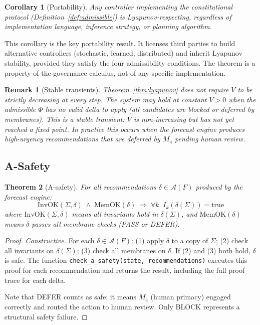 \documentclass[11pt]{article}
\newtheorem{theorem}{Theorem}[section]
\newtheorem{corollary}[theorem]{Corollary}
\newtheorem{remark}{Remark}[section]
\begin{document}
\begin{corollary}[Portability]
Any controller implementing the constitutional protocol
(Definition~\ref{def:admissible}) is Lyapunov-respecting,
regardless of implementation language, inference strategy,
or planning algorithm.
\end{corollary}

This corollary is the key portability result. It licenses third
parties to build alternative controllers (stochastic, learned,
distributed) and inherit Lyapunov stability, provided they satisfy
the four admissibility conditions. The theorem is a property of
the governance calculus, not of any specific implementation.

\begin{remark}[Stable transients]
Theorem~\ref{thm:lyapunov} does not require $V$ to be strictly
decreasing at every step. The system may hold at constant $V > 0$
when the admissible $\Phi$ has no valid delta to apply (all
candidates are blocked or deferred by membranes). This is a
\emph{stable transient}: $V$ is non-increasing but has not yet
reached a fixed point. In practice this occurs when the forecast
engine produces high-urgency recommendations that are deferred
by $M_4$ pending human review.
\end{remark}

\subsection{A-Safety}

\begin{theorem}[A-safety]
\label{thm:a-safety}
For all recommendations $\delta \in \mathcal{A}(F)$ produced by
the forecast engine:
\[
  \mathrm{InvOK}(\Sigma, \delta) \;\wedge\; \mathrm{MemOK}(\delta)
  \;\Longrightarrow\;
  \forall k.\; I_k(\delta(\Sigma)) = \mathrm{true}
\]
where $\mathrm{InvOK}(\Sigma, \delta)$ means all invariants hold
in $\delta(\Sigma)$, and $\mathrm{MemOK}(\delta)$ means $\delta$
passes all membrane checks (PASS or DEFER).
\end{theorem}

\begin{proof}
\emph{Constructive.} For each $\delta \in \mathcal{A}(F)$:
(1) apply $\delta$ to a copy of $\Sigma$;
(2) check all invariants on $\delta(\Sigma)$;
(3) check all membranes on $\delta$.
If (2) and (3) both hold, $\delta$ is safe. The function
\texttt{check\_a\_safety(state, recommendations)} executes this
proof for each recommendation and returns the result, including
the full proof trace for each delta.

Note that DEFER counts as safe: it means $M_4$ (human primacy)
engaged correctly and routed the action to human review. Only
BLOCK represents a structural safety failure.
\end{proof}
\end{document}
